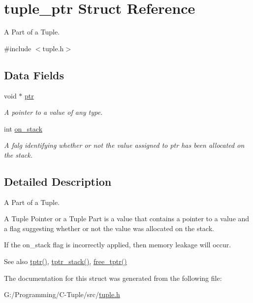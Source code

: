 \hypertarget{structtuple__ptr}{}\section{tuple\+\_\+ptr Struct Reference}
\label{structtuple__ptr}


A Part of a Tuple.  




{\ttfamily \#include $<$tuple.\+h$>$}

\subsection*{Data Fields}
\begin{DoxyCompactItemize}
\item 
void $\ast$ \hyperlink{structtuple__ptr_add9af9569af79ec26dd741fb226b38ba}{ptr}\hypertarget{structtuple__ptr_add9af9569af79ec26dd741fb226b38ba}{}\label{structtuple__ptr_add9af9569af79ec26dd741fb226b38ba}

\begin{DoxyCompactList}\small\item\em A pointer to a value of any type. \end{DoxyCompactList}\item 
int \hyperlink{structtuple__ptr_a5b5a4edd9167c9c2937631f949963954}{on\+\_\+stack}\hypertarget{structtuple__ptr_a5b5a4edd9167c9c2937631f949963954}{}\label{structtuple__ptr_a5b5a4edd9167c9c2937631f949963954}

\begin{DoxyCompactList}\small\item\em A falg identifying whether or not the value assigned to ptr has been allocated on the stack. \end{DoxyCompactList}\end{DoxyCompactItemize}


\subsection{Detailed Description}
A Part of a Tuple. 

A Tuple Pointer or a Tuple Part is a value that contains a pointer to a value and a flag suggesting whether or not the value was allocated on the stack.

If the on\+\_\+stack flag is incorrectly applied, then memory leakage will occur.

\begin{DoxySeeAlso}{See also}
\hyperlink{tuple_8h_aab8b4f7c3d6ed7f76939d132d9656f60}{tptr()}, \hyperlink{tuple_8h_ad407b45f88fa00ec6e549b5b4f214acc}{tptr\+\_\+stack()}, \hyperlink{tuple_8h_a5f040f5026ad0e268ef7d2caf0544bb2}{free\+\_\+tptr()} 
\end{DoxySeeAlso}


The documentation for this struct was generated from the following file\+:\begin{DoxyCompactItemize}
\item 
G\+:/\+Programming/\+C-\/\+Tuple/src/\hyperlink{tuple_8h}{tuple.\+h}\end{DoxyCompactItemize}
